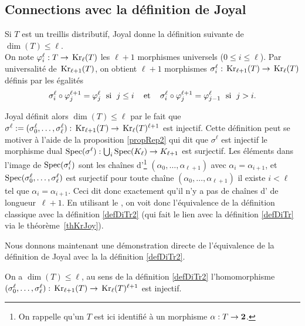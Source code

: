 \subsection{Connections avec la définition de Joyal}
\label{subsubsecJoyal2}


 Si $T$ est un treillis distributif, Joyal \cite{esp} donne
la définition suivante de $\dim(T)\leq \ell$. \\
On note
$\varphi^\ell_i:T\rightarrow \,{\rm Kr}_\ell(T)$ les $\ell+1$ morphismes
universels ($0\leq i\leq \ell$). 
Par universalité de $\,{\rm Kr}_{\ell+1}(T)$, on
obtient $\ell+1$ morphismes $\sigma_i^\ell:\,{\rm Kr}_{\ell+1}(T)\rightarrow
\,{\rm Kr}_\ell(T)$
définis par les égalités 
$$
\sigma_i^\ell\circ \varphi^{\ell+1}_j = \varphi^\ell_j\;\hbox{  si  }\;j\leq i\;\;\;\hbox{ 
et }\;\;\;\sigma_i^\ell\circ \varphi^{\ell+1}_j = \varphi^\ell_{j-1}\;\hbox{  si  }\;j>i.
$$

Joyal définit alors $\dim(T)\leq \ell$ par le fait que
$\sigma^\ell:=(\sigma_0^\ell,\dots,\sigma_\ell^\ell):\,{\rm Kr}_{\ell+1}(T)\rightarrow
\,{\rm Kr}_\ell(T)^{\ell+1}$
est injectif. Cette définition peut se motiver à l'aide de
la proposition \ref{propRep2} qui dit que $\sigma^\ell$ est injectif \ssi 
le morphisme dual ${\rm Spec}(\sigma^\ell): \bigcup_i{\rm Spec}(K_\ell)\to K_{\ell+1}$ est surjectif. Les éléments dans l'image
de ${\rm Spec}(\sigma_i^\ell)$ sont les cha\^ines d'\ideps\footnote{On rappelle qu'un \idep $T$ est ici identifié à un morphisme $\alpha:T\to {\bf 2}$.} 
$(\alpha_0,\dots,\alpha_{\ell+1})$
avec $\alpha_i=\alpha_{i+1}$, et ${\rm Spec}(\sigma_0^\ell,\dots,\sigma_\ell^\ell)$
est surjectif \ssi pour toute cha\^ine $(\alpha_0,\dots,\alpha_{\ell+1})$
il existe $i<\ell$ tel que $\alpha_i=\alpha_{i+1}$. Ceci dit donc
exactement qu'il n'y a pas de cha\^ines d'\ideps 
 de longueur~\hbox{$\ell+1$}. En utilisant le \tcg, on voit donc
l'équivalence de la définition classique avec la définition  \ref{defDiTr2} (qui fait le lien avec la définition \ref{defDiTr}
via le théorème~\ref{thKrJoy}). 

Nous donnons maintenant une démonstration directe de l'équivalence
de la définition de Joyal avec la
 la définition  \ref{defDiTr2}. 


\begin{theorem}
On a $\dim(T)\leq \ell$, au sens de la définition  \ref{defDiTr2}
\ssi l'homomorphisme $(\sigma_0^\ell,\dots,\sigma_\ell^\ell):\,{\rm Kr}_{\ell+1}(T)\rightarrow
\,{\rm Kr}_\ell(T)^{\ell+1}$
est injectif.
\end{theorem}

